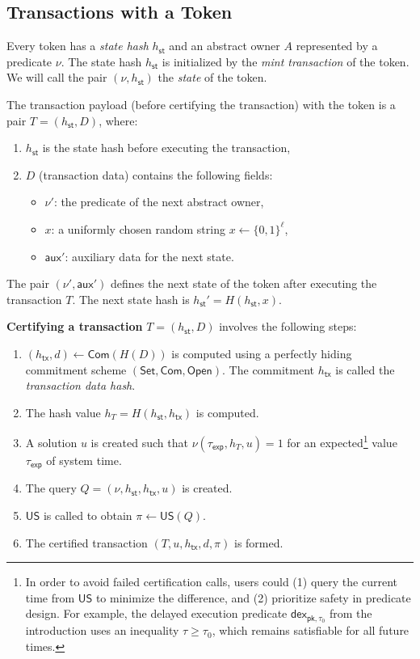 \documentclass{article}
\newcommand{\pubkey}[0]{\mathsf{pk}}
\newcommand{\setup}[0]{\mathsf{Set}}
\newcommand{\commit}[0]{\mathsf{Com}}
\newcommand{\open}[0]{\mathsf{Open}}
\newcommand{\unisrv}[0]{\mathsf{US}}
\newcommand{\sthash}[0]{h_\mathsf{st}}
\newcommand{\txhash}[0]{h_\mathsf{tx}}
\newcommand{\auxd}[0]{\mathsf{aux}}
\newcommand{\predi}[0]{\nu}
\newcommand{\systime}[0]{\tau}
\begin{document}
\subsection{Transactions with a Token}

Every token has a \emph{state hash} $\sthash$ and an abstract owner $A$ represented by a predicate $\predi$. The state hash $\sthash$ is initialized by the \emph{mint transaction} of the token. We will call the pair $(\predi, \sthash)$ the \emph{state} of the token.

The transaction payload (before certifying the transaction) with the token is a pair
$T = (\sthash, D)$, where:
\begin{enumerate}
\item $\sthash$ is the state hash before executing the transaction,
\item $D$ (transaction data) contains the following fields:
\begin{itemize}
\item $\predi'$: the predicate of the next abstract owner,
\item $x$: a uniformly chosen random string $x\gets\{0,1\}^\ell$,
\item $\auxd'$: auxiliary data for the next state.
\end{itemize}
\end{enumerate}

The pair $(\predi', \auxd')$ defines the next state of the token after executing the transaction $T$. The next state hash is $\sthash'=H(\sthash,x)$.
\medskip

\noindent\textbf{Certifying a transaction} $T = (\sthash, D)$ involves the following steps:
\begin{enumerate}
\item $(\txhash,d) \gets \commit(H(D))$ is computed using a perfectly hiding commitment scheme $(\setup,\commit,\open)$.
The commitment $\txhash$ is called the \emph{transaction data hash}.
\item The hash value $h_T = H(\sthash, \txhash)$ is computed.
\item A solution $u$ is created such that $\predi(\systime_\mathsf{exp}, h_T, u) = 1$ for an expected\footnote{In order to avoid failed certification calls, users could (1) query the current time from $\unisrv$ to
  minimize the difference, and (2) prioritize safety in predicate design. For example, the delayed
  execution predicate $\mathsf{dex}_{\pubkey,\tau_0}$ from the introduction uses an inequality
  $\systime \geq \tau_0$, which remains satisfiable for all future times.} value $\systime_\mathsf{exp}$ of system time.
\item The query $Q = (\predi,\sthash,\txhash,u)$ is created.
\item $\unisrv$ is called to obtain $\pi\gets \unisrv(Q)$.
\item The certified transaction $(T,u,\txhash,d,\pi)$ is formed.
\end{enumerate}
\end{document}
